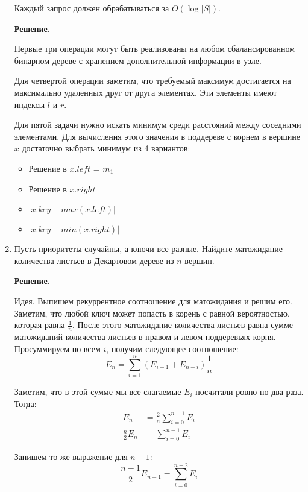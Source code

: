 \begin{enumerate}
	Каждый запрос должен обрабатываться за $O(\log |S|)$.
	
	\textbf{Решение.}
	
	Первые три операции могут быть реализованы на любом сбалансированном бинарном дереве с хранением 
	дополнительной информации в узле. 
	
	Для четвертой операции заметим, что требуемый максимум достигается на максимально удаленных друг от друга 
	элементах. Эти элементы имеют индексы $l$ и $r$.
	
	Для пятой задачи нужно искать минимум среди расстояний между соседними элементами. Для вычисления этого 
	значения в поддереве с корнем в вершине $x$ достаточно выбрать минимум из 4 вариантов:

	\begin{itemize}
		\item Решение в $x.left$ = $m_1$
		\item Решение в $x.right$
		\item $|x.key - max(x.left)|$
		\item $|x.key - min(x.right)|$
	\end{itemize}
	\item Пусть приоритеты случайны, а ключи все разные. Найдите матожидание количества листьев в
	Декартовом дереве из $n$ вершин.
	
	\textbf{Решение.}
	
	Идея. Выпишем рекуррентное соотношение для матожидания и решим его.
	Заметим, что любой ключ может попасть в корень с равной вероятностью, которая равна 
	$\frac{1}{n}$. После этого матожидание количества листьев равна сумме матожиданий количества листьев в правом 
	и левом поддеревьях корня. Просуммируем по всем $i$, получим следующее соотношение:
	\begin{equation*}
	E_n = \sum\limits_{i = 1}^{n} (E_{i - 1} + E_{n - i}) \frac{1}{n}
	\end{equation*}
	
	Заметим, что в этой сумме мы все слагаемые $E_i$ посчитали ровно по два раза. Тогда:
	\begin{align*}
	E_n &= \frac{2}{n} \sum\limits_{i = 0}^{n - 1} E_i \\
	\frac{n}{2} E_n &= \sum\limits_{i = 0}^{n - 1} E_i
	\end{align*}
	
	Запишем то же выражение для $n - 1$:
	\begin{equation*}
	\frac{n - 1}{2}E_{n - 1} = \sum\limits_{i = 0}^{n - 2} E_i
	\end{equation*}


\end{enumerate}
